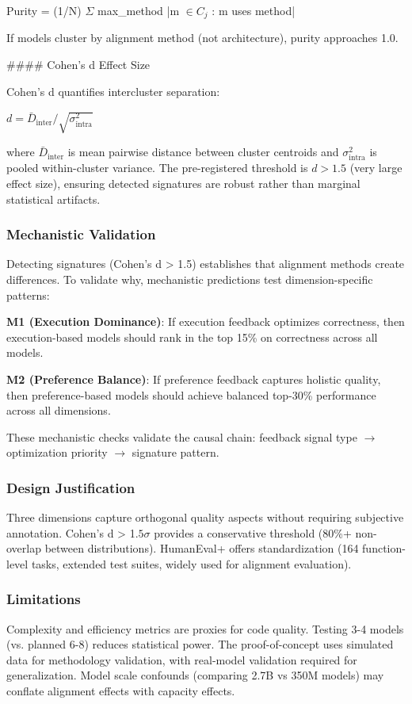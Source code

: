 Purity = (1/N) $\Sigma$ max\_method |{m $\in C_j$ : m uses method}|

If models cluster by alignment method (not architecture), purity approaches 1.0.

\#\#\#\# Cohen's d Effect Size

Cohen's d quantifies intercluster separation:

$d = \bar{D}_{\text{inter}} / \sqrt{\sigma^{2}_{\text{intra}}}$

where $\bar{D}_{\text{inter}}$ is mean pairwise distance between cluster centroids and $\sigma^{2}_{\text{intra}}$ is pooled within-cluster variance. The pre-registered threshold is $d > 1.5$ (very large effect size), ensuring detected signatures are robust rather than marginal statistical artifacts.

\subsubsection{Mechanistic Validation}

Detecting signatures (Cohen's d > 1.5) establishes that alignment methods create differences. To validate why, mechanistic predictions test dimension-specific patterns:

\textbf{M1 (Execution Dominance)}: If execution feedback optimizes correctness, then execution-based models should rank in the top 15\% on correctness across all models.

\textbf{M2 (Preference Balance)}: If preference feedback captures holistic quality, then preference-based models should achieve balanced top-30\% performance across all dimensions.

These mechanistic checks validate the causal chain: feedback signal type $\rightarrow$ optimization priority $\rightarrow$ signature pattern.

\subsubsection{Design Justification}

Three dimensions capture orthogonal quality aspects without requiring subjective annotation. Cohen's d > 1.$5\sigma$ provides a conservative threshold (80\%+ non-overlap between distributions). HumanEval+ offers standardization (164 function-level tasks, extended test suites, widely used for alignment evaluation).

\subsubsection{Limitations}

Complexity and efficiency metrics are proxies for code quality. Testing 3-4 models (vs. planned 6-8) reduces statistical power. The proof-of-concept uses simulated data for methodology validation, with real-model validation required for generalization. Model scale confounds (comparing 2.7B vs 350M models) may conflate alignment effects with capacity effects.

